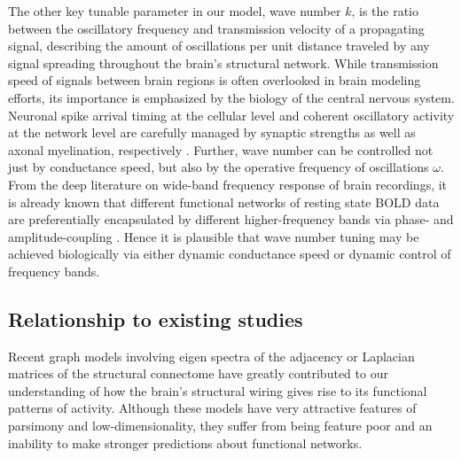 The other key tunable parameter in our model, wave number $k$, is the ratio between the oscillatory frequency and transmission velocity of a propagating signal, describing the amount of oscillations per unit distance traveled by any signal spreading throughout the brain's structural network. While transmission speed of signals between brain regions is often overlooked in brain modeling efforts, its importance is emphasized by the biology of the central nervous system. Neuronal spike arrival timing at the cellular level and coherent oscillatory activity at the network level are carefully managed by synaptic strengths as well as axonal myelination, respectively \cite{arancibia-carcamo_node_2017, fields_new_2015}. Further, wave number can be controlled not just by conductance speed, but also by the operative frequency of oscillations $\omega$. From the deep literature on wide-band frequency response of brain recordings, it is already known that different functional networks of resting state BOLD data are preferentially encapsulated by different higher-frequency bands via phase- and amplitude-coupling \cite{ghosh_cortical_2008, Deco2009}. Hence it is plausible that wave number tuning may be achieved biologically via either dynamic conductance speed or dynamic control of frequency bands.

\subsection{Relationship to existing studies}

Recent graph models involving eigen spectra of the adjacency or Laplacian matrices of the structural connectome have greatly contributed to our understanding of how the brain's structural wiring gives rise to its functional patterns of activity. Although these models have very attractive features of parsimony and low-dimensionality, they suffer from being feature poor and an inability to make stronger predictions about functional networks. 

